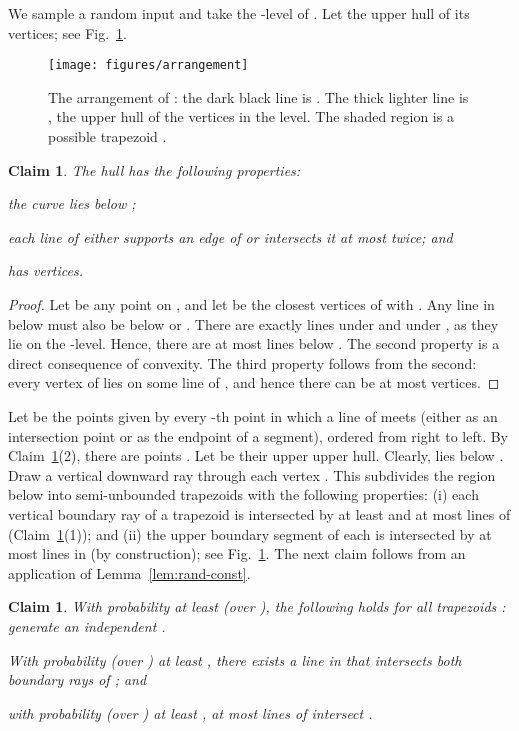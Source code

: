 \documentclass[letterpaper,11pt]{article}
\newtheorem{claim}[theorem]{Claim}
\begin{document}
We sample a random input 
and take the -level 
of . Let 
the upper hull of its vertices; 
see Fig.~\ref{fig:arrangement}.
\begin{figure}
  \centering
  \texttt{[image: figures/arrangement]}
  \caption{The arrangement of : the 
    dark black line is . 
    The thick lighter line
    is , the upper hull of the vertices 
    in the level. The shaded region 
    is a possible trapezoid .}
  \label{fig:arrangement}
\end{figure}
\begin{claim}\label{clm:H_properties}
  The hull  has the following properties:
  \begin{asparaenum}
    \item 
      the curve  lies below ;
     \item 
       each line of  either supports 
       an edge of  or intersects 
       it at most twice; and
     \item 
        has  vertices.
  \end{asparaenum}
\end{claim}
\begin{proof} 
Let  be any point 
on , and let 
be the closest vertices of  with
.
Any line in  below
 must also be below  or . 
There are exactly  lines
under  and under , as they lie
on the -level. Hence,
there are at most  lines 
below .  The second property 
is a direct consequence of convexity.
The third property follows from the 
second: every vertex of  lies 
on some line of , and hence
there can be at most  vertices.
\end{proof}

Let  be the 
points given by every -th 
point in which a line of  meets 
 (either as an intersection point 
or as the endpoint of a segment), 
ordered from right to left.
By Claim~\ref{clm:H_properties}(2), there 
are  points . 
Let  be their upper upper hull.
Clearly,  lies below .
Draw a vertical downward ray through each vertex
. This subdivides the region below 
 into semi-unbounded trapezoids
 with
the following properties:
(i) each vertical boundary ray 
  of a trapezoid  is intersected
  by at least  and at most
   lines of  
  (Claim~\ref{clm:H_properties}(1)); and 
(ii) the upper boundary
  segment of each  is intersected 
  by at most  lines in 
   (by construction); see 
  Fig.~\ref{fig:arrangement}.
The next claim follows from an 
application of Lemma~\ref{lem:rand-const}.

\begin{claim}\label{clm:taui}
  With probability at least 
   \textup(over 
  \textup), the 
  following holds for all 
  trapezoids : 
  generate an
  independent .
  \begin{asparaenum}
    \item With probability 
    \textup(over \textup) 
    at least , 
    there exists a line in  
    that intersects both 
    boundary rays of ; and
    \item with probability 
    \textup(over \textup) at 
    least , at 
    most  lines 
    of  intersect .
\end{asparaenum}
\end{claim}
\end{document}

